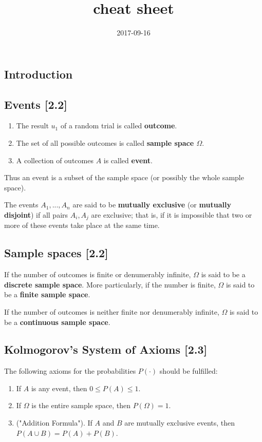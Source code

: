 \documentclass[a4paper,9pt]{extarticle}
\title{cheat sheet}
\date{2017-09-16}
\begin{document}
\begin{multicols*}{2}
\section{Introduction}
\subsection{Events [2.2]}
\begin{enumerate}[label=\bfseries (\arabic*)] \itemsep0pt \parskip0pt
    \item The result $u_1$ of a random trial is called \textbf{outcome}.
    \item The set of all possible outcomes is called \textbf{sample space $\Omega$}.
    \item A collection of outcomes $A$ is called \textbf{event}.
\end{enumerate}

Thus an event is a subset of the sample space (or possibly the whole sample space).

The events $A_1, ..., A_n$ are said to be \textbf{mutually exclusive} (or \textbf{mutually disjoint}) if all pairs $A_i, A_j$ are exclusive; that is, if it is impossible that two or more of these events take place at the same time.

\subsection{Sample spaces [2.2]}
If the number of outcomes is finite or denumerably infinite, $\Omega$ is said to be a \textbf{discrete sample space}. More particularly, if the number is finite, $\Omega$ is said to be a \textbf{finite sample space}.

If the number of outcomes is neither finite nor denumerably infinite, $\Omega$ is said to be a \textbf{continuous sample space}.

\subsection{Kolmogorov's System of Axioms [2.3]}
The following axioms for the probabilities $P(\cdot)$ should be fulfilled:
\begin{enumerate}[label=\bfseries A\arabic*.] \itemsep0pt \parskip0pt
    \item If $A$ is any event, then $0 \leq P(A) \leq 1$.
    \item If $\Omega$ is the entire sample space, then $P(\Omega) = 1$.
    \item ("Addition Formula"). If $A$ and $B$ are mutually exclusive events, then $P(A \cup B) = P(A) + P(B)$.
\end{enumerate}


\end{multicols*}
\end{document}
